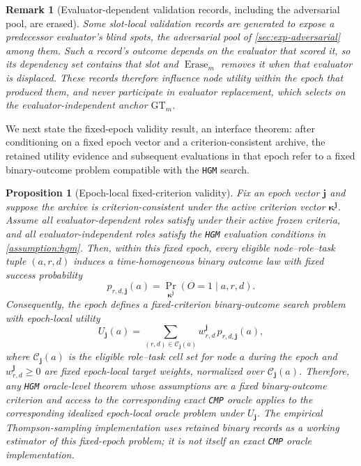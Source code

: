 \documentclass{paper}
\newtheorem{proposition}{Proposition}
\newtheorem{remark}{Remark}
\newcommand{\hgm}{\texttt{HGM}\xspace}
\newcommand{\cmp}{\texttt{CMP}\xspace}
\begin{document}
\begin{remark}[Evaluator-dependent validation records, including the adversarial pool, are erased]
\label{rem:eval-dependent-erase}
Some slot-local validation records are generated to expose a predecessor evaluator's blind spots, the adversarial pool of \cref{sec:exp-adversarial} among them. Such a record's outcome depends on the evaluator that scored it, so its dependency set contains that slot and \(\operatorname{Erase}_m\) removes it when that evaluator is displaced. These records therefore influence node utility within the epoch that produced them, and never participate in evaluator replacement, which selects on the evaluator-independent anchor \(\mathrm{GT}_m\).
\end{remark}

We next state the fixed-epoch validity result, an interface theorem: after conditioning on a fixed epoch vector and a criterion-consistent archive, the retained utility evidence and subsequent evaluations in that epoch refer to a fixed binary-outcome problem compatible with the \hgm search.

\begin{proposition}[Epoch-local fixed-criterion validity]
\label{prop:validity}
Fix an epoch vector \(\boldsymbol{j}\) and suppose the archive is criterion-consistent under the active
criterion vector \(\boldsymbol{\kappa}^{\boldsymbol{j}}\). Assume all evaluator-dependent roles satisfy
 under their active frozen criteria, and all evaluator-independent roles
satisfy the \hgm evaluation conditions in \cref{assumption:hgm}. Then, within this fixed epoch,
every eligible node--role--task tuple \((a,r,d)\) induces a time-homogeneous binary outcome law
with fixed success probability
\[
p_{r,d,\boldsymbol{j}}(a)
=
\Pr_{\boldsymbol{\kappa}^{\boldsymbol{j}}}\!\left(O=1\mid a,r,d\right).
\]
Consequently, the epoch defines a fixed-criterion binary-outcome search problem with epoch-local
utility
\[
U_{\boldsymbol{j}}(a)
=
\sum_{(r,d)\in\mathcal C_{\boldsymbol{j}}(a)}
w_{r,d}^{\boldsymbol{j}}\,p_{r,d,\boldsymbol{j}}(a),
\]
where \(\mathcal C_{\boldsymbol{j}}(a)\) is the eligible role--task cell set for node \(a\) during the epoch
and \(w_{r,d}^{\boldsymbol{j}}\ge 0\) are fixed epoch-local target weights, normalized over
\(\mathcal C_{\boldsymbol{j}}(a)\). Therefore, any \hgm oracle-level theorem whose assumptions are a
fixed binary-outcome criterion and access to the corresponding exact \cmp oracle applies to the
corresponding idealized epoch-local oracle problem under \(U_{\boldsymbol{j}}\). The empirical
Thompson-sampling implementation uses retained binary records as a working estimator of this
fixed-epoch problem; it is not itself an exact \cmp oracle implementation.
\end{proposition}
\end{document}
